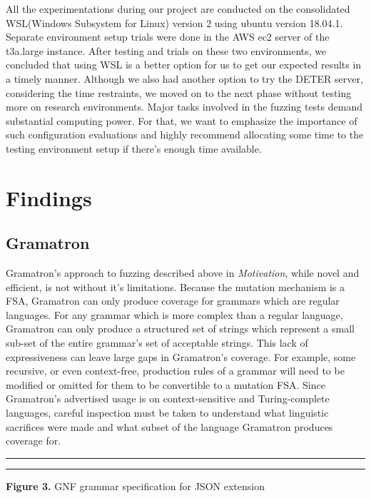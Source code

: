 \documentclass[12pt]{diazessay}
\begin{document}
All the experimentations during our project are conducted on the consolidated WSL(Windows Subsystem for Linux) version 2 using ubuntu version 18.04.1.
Separate environment setup trials were done in the AWS ec2 server of the t3a.large instance.
After testing and trials on these two environments, we concluded that using WSL is a better option for us to get our expected results in a timely manner.
Although we also had another option to try the DETER server, considering the time restraints, we moved on to the next phase without testing more on research environments.
Major tasks involved in the fuzzing tests demand substantial computing power.
For that, we want to emphasize the importance of such configuration evaluations and highly recommend allocating some time to the testing environment setup if there's enough time available.

\section*{Findings}
\label{results}

\subsection*{Gramatron}

Gramatron's approach to fuzzing described above in \emph{Motivation}, while novel and efficient, is not without it's limitations.
Because the mutation mechanism is a FSA, Gramatron can only produce coverage for grammars which are regular languages.
For any grammar which is more complex than a regular language, Gramatron can only produce a structured set of strings which represent a small sub-set of the entire grammar's set of acceptable strings.
This lack of expressiveness can leave large gaps in Gramatron's coverage.
For example, some recursive, or even context-free, production rules of a grammar will need to be modified or omitted for them to be convertible to a mutation FSA.
Since Gramatron's advertised usage is on context-sensitive and Turing-complete languages, careful inspection must be taken to understand what linguistic sacrifices were made and what subset of the language Gramatron produces coverage for.

\vspace{10mm}
\hrule height 0.4mm
\begingroup \fontsize{10pt}{10pt} \selectfont \begin{alltt}

\end{alltt} \vspace{-6mm} \endgroup \hrule height 0.4mm
\vspace{6mm}
\centerline{\textbf{Figure 3.} GNF grammar specification for JSON extension}
\vspace{6mm}
\end{document}
